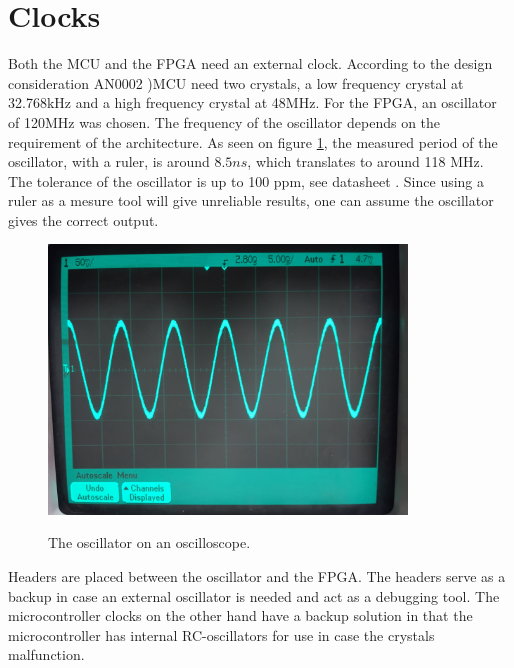\documentclass[../main/report.tex]{subfiles}
\begin{document}
\section{Clocks}
Both the MCU and the FPGA need an external clock.
According to the design consideration AN0002 \cite{efm32gg-design-consideration})MCU need two crystals, a low frequency crystal at 32.768kHz and a high frequency crystal at 48MHz. 
For the FPGA, an oscillator of 120MHz was chosen. The frequency of the oscillator depends on the requirement of the architecture.
As seen on figure \ref{fig:oscillator-scope}, the measured period of the oscillator, with a ruler, is around $8.5 ns$, which translates to around 118 MHz.
The tolerance of the oscillator is up to 100 ppm, see datasheet \cite{xpresso-oscillator}.
Since using a ruler as a mesure tool will give unreliable results, one can assume the oscillator gives the correct output.

\begin{figure}[H]
    \centering
    \includegraphics[width=0.85\textwidth]{../pcb/assets/oscillator.jpg}
    \label{fig:oscillator-scope}
    \caption{The oscillator on an oscilloscope.}
\end{figure}

Headers are placed between the oscillator and the FPGA. 
The headers serve as a backup in case an external oscillator is needed and act as a debugging tool.
The microcontroller clocks on the other hand have a backup solution in that the microcontroller has internal RC-oscillators for use in case the crystals malfunction.
\end{document}
